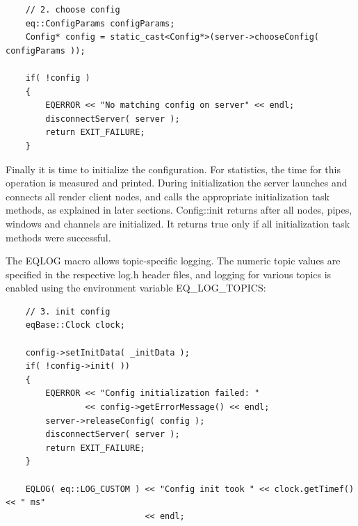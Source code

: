 \documentclass[10pt,a4]{scrartcl}
\begin{document}
{\footnotesize\begin{lstlisting}
    // 2. choose config
    eq::ConfigParams configParams;
    Config* config = static_cast<Config*>(server->chooseConfig( configParams ));

    if( !config )
    {
        EQERROR << "No matching config on server" << endl;
        disconnectServer( server );
        return EXIT_FAILURE;
    }
\end{lstlisting}}%

Finally it is time to initialize the configuration. For statistics, the
time for this operation is measured and printed. During initialization
the server launches and connects all render client nodes, and calls the
appropriate initialization task methods, as explained in later
sections. \textsf{Config::init} returns after all nodes, pipes,
windows and channels are initialized. It returns \textsf{true} only if
all initialization task methods were successful.

The \textsf{EQLOG} macro allows topic-specific logging. The numeric
topic values are specified in the respective \textsf{log.h} header
files, and logging for various topics is enabled using the environment
variable \textsf{EQ\_LOG\_TOPICS}:

{\footnotesize\begin{lstlisting}
    // 3. init config
    eqBase::Clock clock;

    config->setInitData( _initData );
    if( !config->init( ))
    {
        EQERROR << "Config initialization failed: " 
                << config->getErrorMessage() << endl;
        server->releaseConfig( config );
        disconnectServer( server );
        return EXIT_FAILURE;
    }

    EQLOG( eq::LOG_CUSTOM ) << "Config init took " << clock.getTimef() << " ms"
                            << endl;
\end{lstlisting}}%
\end{document}
